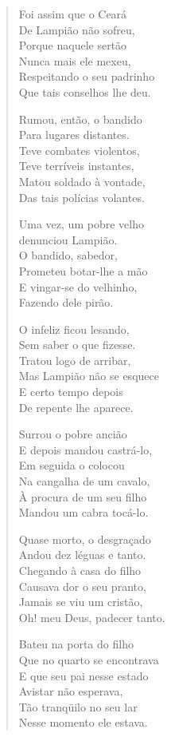 \begin{verse}
Foi assim que o Ceará\\
De Lampião não sofreu,\\
Porque naquele sertão\\
Nunca mais ele mexeu,\\
Respeitando o seu padrinho\\
Que tais conselhos lhe deu.


Rumou, então, o bandido\\
Para lugares distantes.\\
Teve combates violentos,\\
Teve terríveis instantes,\\
Matou soldado à vontade,\\
Das tais polícias volantes.

Uma vez, um pobre velho\\
denunciou Lampião.\\
O bandido, sabedor,\\
Prometeu botar-lhe a mão\\
E vingar-se do velhinho,\\
Fazendo dele pirão.

O infeliz ficou lesando,\\
Sem saber o que fizesse.\\
Tratou logo de arribar,\\
Mas Lampião não se esquece\\
E certo tempo depois\\
De repente lhe aparece.

Surrou o pobre ancião\\
E depois mandou castrá-lo,\\
Em seguida o colocou\\
Na cangalha de um cavalo,\\
À procura de um seu filho\\
Mandou um cabra tocá-lo.


Quase morto, o desgraçado\\
Andou dez léguas e tanto.\\
Chegando à casa do filho\\
Causava dor o seu pranto,\\
Jamais se viu um cristão,\\
Oh! meu Deus, padecer tanto.

Bateu na porta do filho\\
Que no quarto se encontrava\\
E que seu pai nesse estado\\
Avistar não esperava,\\
Tão tranqüilo no seu lar\\
Nesse momento ele estava.


\end{verse}
